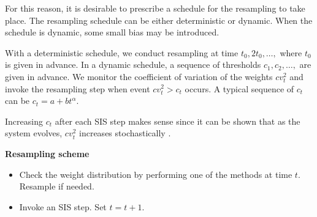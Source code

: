 \documentclass[times, utf8, diplomski]{fer}
\begin{document}
For this reason, it is desirable to prescribe a schedule for the resampling to take place. The resampling schedule can be either deterministic or dynamic. When the schedule is dynamic, some small bias may be introduced.

With a deterministic schedule, we conduct resampling at time $t_0, 2t_0, \ldots,$ where $t_0$ is given in advance. In a dynamic schedule, a sequence of thresholds $c_1, c_2, \ldots,$ are given in advance. We monitor the coefficient of variation of the weights $cv_t^2$ and invoke the resampling step when event $cv_t^2 > c_t$ occurs. A typical sequence of $c_t$ can be $c_t = a + bt^\alpha$.

Increasing $c_t$ after each SIS step makes sense since it can be shown that as the system evolves, $cv_t^2$ increases stochastically \cite{Kong94}.

\vspace{10mm}
\textbf{Resampling scheme}
\begin{itemize}
\item{Check the weight distribution by performing one of the methods at time $t$. Resample if needed.}
\item{Invoke an SIS step. Set $t = t + 1$.}
\end{itemize}

%
%
\end{document}
